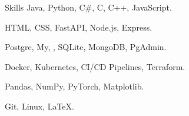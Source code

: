 \begin{rubric}{Skills}
    \entry*[Programming]%
        Java, Python, C\#, C, C++, JavaScript.

    \entry*[Web]%
        \textsc{HTML, CSS}, FastAPI, Node.js, Express.

    \entry*[Databases]%
        Postgre, My, , SQLite, MongoDB, PgAdmin.

    \entry*[DevOps]%
        Docker, Kubernetes, CI/CD Pipelines, Terraform.

        Pandas, NumPy, PyTorch, Matplotlib.

    \entry*[Tools]%
        Git, Linux, LaTeX.
\end{rubric}
